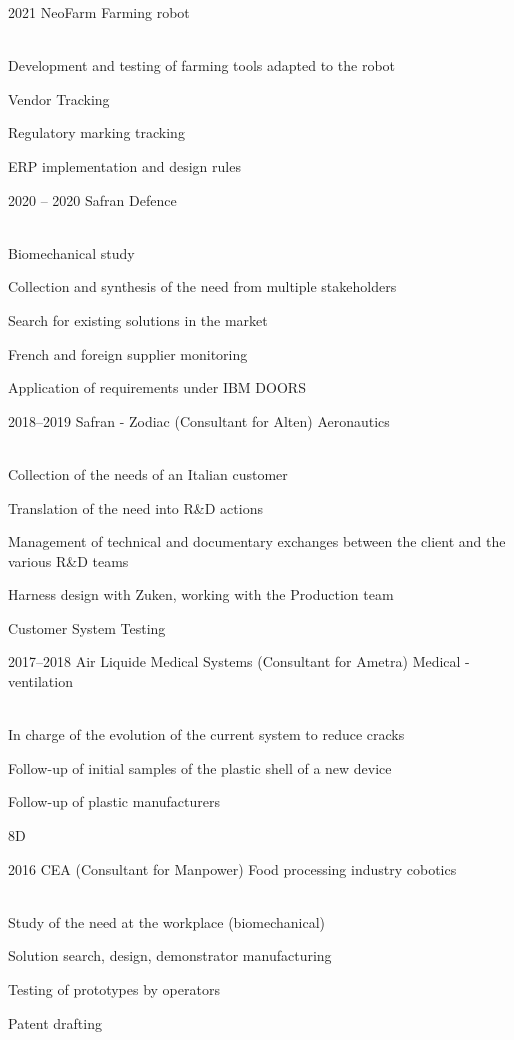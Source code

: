 \documentclass{cv-style}     %
\begin{document}
\begin{entrylist}
\entry
  {2021}
  {NeoFarm}
  {Farming robot}
  {\\
  Development and testing of farming tools adapted to the robot

  Vendor Tracking

  Regulatory marking tracking

  ERP implementation and design rules
   }
 
\entry
  {2020 -- 2020}
  {Safran}
  {Defence}
  {\\
  Biomechanical study

  Collection and synthesis of the need from multiple stakeholders

  Search for existing solutions in the market

  French and foreign supplier monitoring

  Application of requirements under IBM DOORS
  }
\entry
  {2018--2019}
  {Safran - Zodiac (Consultant for Alten)}
  {Aeronautics}
  {\\
  Collection of the needs of an Italian customer

  Translation of the need into R\&D actions

  Management of technical and documentary exchanges between the client and the various R\&D teams

  Harness design with Zuken, working with the Production team

  Customer System Testing
 
  }
\entry
 {2017--2018}
 {Air Liquide Medical Systems (Consultant for Ametra)}
 {Medical - ventilation}
 {\\
 In charge of the evolution of the current system to reduce cracks

 Follow-up of initial samples of the plastic shell of a new device

 Follow-up of plastic manufacturers

 8D
 }
\entry
 {2016}
 {CEA (Consultant for Manpower)}
 {Food processing industry cobotics}
 {\\
 Study of the need at the workplace (biomechanical)

 Solution search, design, demonstrator manufacturing

 Testing of prototypes by operators

 Patent drafting
 }

\end{entrylist}
\end{document}
